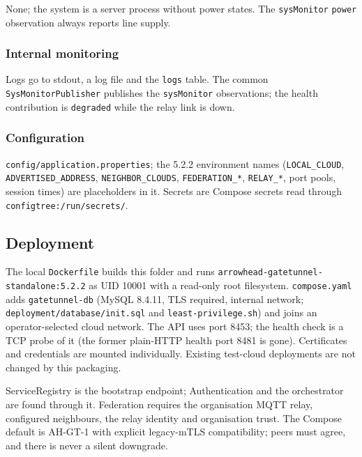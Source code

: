\documentclass[a4paper]{arrowhead}
\begin{document}
None; the system is a server process without power states. The \texttt{sysMonitor} \texttt{power} observation always reports line supply.

\subsubsection{Internal monitoring}

Logs go to stdout, a log file and the \texttt{logs} table. The common \texttt{SysMonitorPublisher} publishes the \texttt{sysMonitor} observations; the health contribution is \texttt{degraded} while the relay link is down.

\subsubsection{Configuration}

\texttt{config/\allowbreak{}application.\allowbreak{}properties}; the 5.2.2 environment names (\texttt{LOCAL\_\allowbreak{}CLOUD}, \texttt{ADVERTISED\_\allowbreak{}ADDRESS}, \texttt{NEIGHBOR\_\allowbreak{}CLOUDS}, \texttt{FEDERATION\_\allowbreak{}*}, \texttt{RELAY\_\allowbreak{}*}, port pools, session times) are placeholders in it. Secrets are Compose secrets read through \texttt{configtree:/\allowbreak{}run/\allowbreak{}secrets/}.

\subsection{Deployment}

The local \texttt{Dockerfile} builds this folder and runs \texttt{arrowhead-\allowbreak{}gatetunnel-\allowbreak{}standalone:5.2.2} as UID 10001 with a read-only root filesystem. \texttt{compose.yaml} adds \texttt{gatetunnel-\allowbreak{}db} (MySQL 8.4.11, TLS required, internal network; \texttt{deployment/\allowbreak{}database/\allowbreak{}init.sql} and \texttt{least-\allowbreak{}privilege.sh}) and joins an operator-selected cloud network. The API uses port 8453; the health check is a TCP probe of it (the former plain-HTTP health port 8481 is gone). Certificates and credentials are mounted individually. Existing test-cloud deployments are not changed by this packaging.

ServiceRegistry is the bootstrap endpoint; Authentication and the orchestrator are found through it. Federation requires the organisation MQTT relay, configured neighbours, the relay identity and organisation trust. The Compose default is AH-GT-1 with explicit legacy-mTLS compatibility; peers must agree, and there is never a silent downgrade.
\end{document}
